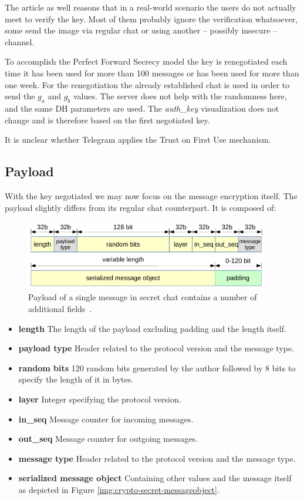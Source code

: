 \documentclass[thesis=M,english]{FITthesis}[2012/10/20]
\begin{document}
The article as well reasons that in a real-world scenario the users do not actually meet to verify the key. Most of them probably ignore the verification whatsoever, some send the image via regular chat or using another -- possibly insecure -- channel.

To accomplish the Perfect Forward Secrecy model the key is renegotiated each time it has been used for more than 100 messages or has been used for more than one week. For the renegotiation the already established chat is used in order to send the $g_a$ and $g_b$ values. The server does not help with the randomness here, and the same DH parameters are used. The \emph{auth\_key} visualization does not change and is therefore based on the first negotiated key.

It is unclear whether Telegram applies the Trust on First Use mechanism.


\subsection{Payload}

With the key negotiated we may now focus on the message encryption itself. The payload slightly differs from its regular chat counterpart. It is composed of:

\begin{figure}[htb]
	\centering
	\includegraphics[width=0.95\textwidth]{secret-payload.pdf}
	\caption[Message payload in secret chats]{Payload of a single message in secret chat contains a number of additional fields~\cite{telegram-aarhus}.}
	\label{img:crypto-secret-payload}
\end{figure}

\begin{itemize}
	\item  \textbf{length} The length of the payload excluding padding and the length itself.
	\item  \textbf{payload type} Header related to the protocol version and the message type.
	\item  \textbf{random bits} 120 random bits generated by the author followed by 8 bits to specify the length of it in bytes.
	\item  \textbf{layer} Integer specifying the protocol version.
	\item  \textbf{in\_seq} Message counter for incoming messages.
	\item  \textbf{out\_seq} Message counter for outgoing messages.
	\item  \textbf{message type} Header related to the protocol version and the message type.
	\item  \textbf{serialized message object} Containing other values and the message itself as depicted in Figure \ref{img:crypto-secret-messageobject}.
\end{itemize}
\end{document}
